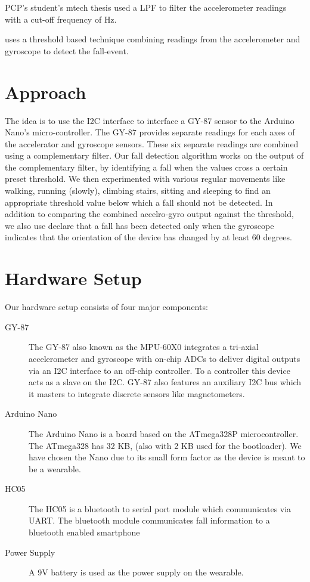 \documentclass[11pt, a4paper]{article}
\begin{document}
{\color{red} PCP's student's mtech thesis} used a LPF to filter the
accelerometer readings with a cut-off frequency of {\color{red} Hz}.

\cite{Wu2015} uses a threshold based technique combining readings from
the accelerometer and gyroscope to detect the fall-event.

\section{Approach}
The idea is to use the I2C interface to interface a GY-87 sensor to the
Arduino Nano's micro-controller. The GY-87 provides separate readings for each
axes of the accelerator and gyroscope sensors. These six separate readings are
combined using a complementary filter. Our fall detection algorithm works on
the output of the complementary filter, by identifying a fall when the values
cross a certain preset threshold. We then experimented with various regular
movements like walking, running (slowly), climbing stairs, sitting and
sleeping to find an appropriate threshold value below which a fall should not
be detected. In addition to comparing the combined accelro-gyro output against
the threshold, we also use declare that a fall has been detected only when the
gyroscope indicates that the orientation of the device has changed by at least
60 degrees.

\section{Hardware Setup}
Our hardware setup consists of four major components:
\begin{description}
   \item [GY-87] The GY-87 also known as the MPU-60X0 integrates a
      tri-axial accelerometer and gyroscope with on-chip ADCs to deliver
      digital outputs via an I2C interface to an off-chip controller. To
      a controller this device acts as a slave on the I2C. GY-87 also
      features an auxiliary I2C bus which it masters to integrate
      discrete sensors like magnetometers.

   \item [Arduino Nano] The Arduino Nano is a board based on the
      ATmega328P microcontroller. The ATmega328 has 32 KB, (also with 2
      KB used for the bootloader). We have chosen the Nano due to its
      small form factor as the device is meant to be a wearable.

   \item [HC05] The HC05 is a bluetooth to serial port module which
      communicates via UART. The bluetooth module communicates fall
      information to a bluetooth enabled smartphone

   \item [Power Supply] A 9V battery is used as the power supply on the
      wearable.
\end{description}
\end{document}
